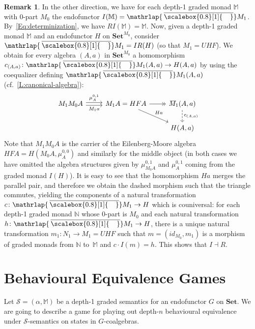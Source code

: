 \documentclass[sigconf,
			final%
			nonacm
                        ]{acmart}
\numberwithin{equation}{section}
\numberwithin{equation}{section}
\theoremstyle{plain}
\theoremstyle{definition}
\newtheorem{rem}[thm]{Remark}
\newcommand{\mybar}[3]{%
  \mathrlap{\hspace{#2}\overline{\scalebox{#1}[1]{\hphantom{\ensuremath{#3}}\vphantom{\rule{0pt}{5.5pt}}}}}\ensuremath{#3}
}
\newcommand{\barM}{\mybar{0.8}{2pt}{M}_1}
\newcommand{\M}{\mathbb{M}}                   %
\newcommand{\Set}{\mathbf{Set}}
\newcommand{\CalS}{\mathcal{S}}        %
\begin{document}
\begin{rem}
  In the other direction, we have for each depth-1 graded monad $\M$
  with $0$-part $M_0$ the endofunctor $I(\M) =
  \barM$. By~\eqref{Eq:determinization}, we have $RI(\M) = \M$.
  Now, given a depth-1 graded monad $\M$ and an endofunctor $H$ on
  $\Set^{M_0}$, consider $\barM = IR(H)$ (so that $M_1 = UHF$). We
  obtain for every algebra $(A,a)$ in $\Set^{M_0}$ a homomorphism
  $c_{(A,a)}\colon \barM (A,a) \to H(A,a)$ by using the coequalizer
  defining $\barM(A,a)$ (cf.~\cref{L:canonical-algebra}):
  \[
    \begin{tikzcd}
      M_1M_0 A
      \ar[yshift=2]{r}{\mu^{0,1}_A}
      \ar[yshift=-2]{r}[swap]{M_1a}
      &
      M_1A=HFA
      \ar[->>]{r}
      \ar{rd}{Ha}
      &
      \barM (A,a)
      \ar[dashed]{d}{c_{(A,a)}}
      \\
      &&
      H(A,a)
    \end{tikzcd}
  \]
  Note that $M_1M_0A$ is the carrier of the Eilenberg-Moore algebra
  $HFA = H(M_0A, \mu^{0,0}_A)$ and similarly for the middle object (in
  both cases we have omitted the algebra structures given by
  $\mu^{0,1}_{M_0 A}$ and $\mu^{0,1}_A$ coming from the graded monad
  $I(H)$).  It is easy to see that the homomorphism $Ha$ merges the
  parallel pair, and therefore we obtain the dashed morphism such that
  the triangle commutes, yielding the components of a natural
  transformation $c\colon \barM \to H$ which is couniversal: for each
  depth-1 graded monad $\mathbb N$ whose $0$-part is $M_0$ and each
  natural transformation $h\colon \barM \to H$, there is a unique
  natural transformation $m_1\colon N_1 \to M_1 = UHF$ such that
  $m = (id_{M_0}, m_1)$ is a morphism of graded monads from
  $\mathbb N$ to~$\M$ and $c \cdot I(m) = h$. This shows that $I
  \dashv R$.
\end{rem}





\section{Behavioural Equivalence Games}\label{S:games}
Let $\CalS = (\alpha, \M)$ be a depth-1 graded semantics for an
endofunctor $G$ on $\Set$. We are going to describe a game for playing
out depth-$n$ behavioural equivalence under $\CalS$-semantics on
states in $G$-coalgebras.
\end{document}
